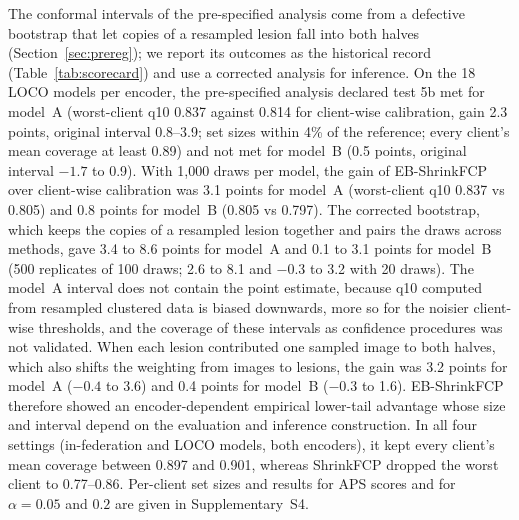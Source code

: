 \documentclass[VANCOUVER,Times1COL]{WileyNJDv5}
\begin{document}
The conformal intervals of the pre-specified analysis come from a defective bootstrap that let copies of a
resampled lesion fall into both halves (Section~\ref{sec:prereg}); we report its outcomes as the historical
record (Table~\ref{tab:scorecard}) and use a corrected analysis for inference. On the 18 LOCO models per
encoder, the pre-specified analysis declared test 5b met for model~A (worst-client q10 0.837 against 0.814
for client-wise calibration, gain 2.3 points, original interval 0.8--3.9; set sizes within 4\% of the
reference; every client's mean coverage at least 0.89) and not met for model~B (0.5 points, original
interval $-1.7$ to 0.9). With 1,000 draws per model, the gain of EB-ShrinkFCP over client-wise calibration
was 3.1 points for model~A (worst-client q10 0.837 vs 0.805) and 0.8 points for model~B (0.805 vs 0.797).
The corrected bootstrap, which keeps the copies of a resampled lesion together and pairs the draws across
methods, gave 3.4 to 8.6 points for model~A and 0.1 to 3.1 points for model~B (500 replicates of 100 draws;
2.6 to 8.1 and $-0.3$ to 3.2 with 20 draws). The model~A interval does not contain the point estimate,
because q10 computed from resampled clustered data is biased downwards, more so for the noisier client-wise
thresholds, and the coverage of these intervals as confidence procedures was not validated. When each lesion
contributed one sampled image to both halves, which also shifts the weighting from images to lesions, the
gain was 3.2 points for model~A ($-0.4$ to 3.6) and 0.4 points for model~B ($-0.3$ to 1.6). EB-ShrinkFCP
therefore showed an encoder-dependent empirical lower-tail advantage whose size and interval depend on the
evaluation and inference construction. In all four settings (in-federation and LOCO models, both
encoders), it kept every client's mean coverage between 0.897 and 0.901, whereas ShrinkFCP dropped the worst
client to 0.77--0.86. Per-client set sizes and results for APS scores and for $\alpha=0.05$ and $0.2$ are
given in Supplementary~S4.
\end{document}

